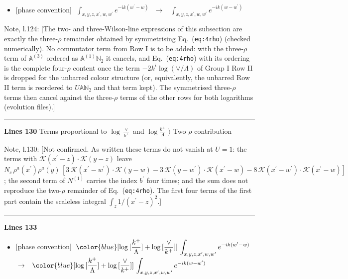 \documentclass[10pt]{article}
\newenvironment{notebox}{\def\FrameCommand{{\color{notebar}\vrule width 1.5pt}\hspace{6pt}}\MakeFramed{\advance\hsize-\width\FrameRestore}\small}{\endMakeFramed}
\def\mf#1{\mathbb{#1}}
\begin{document}
\begin{itemize}[leftmargin=2.2em,itemsep=1pt,topsep=2pt]
\item[\textbf{l.120}] \textsf{\small [phase convention]} $\displaystyle \,\,\int_{x,y,z,x^{\prime},w,w^{\prime}}e^{-ik(w^{\prime}-w)}\,$\ $\longrightarrow$\ $\displaystyle \,\,\int_{x,y,z,x^{\prime},w,w^{\prime}}e^{-ik(w-w^{\prime})}\,$
\end{itemize}
\begin{notebox}\textsf{\small Note, l.124:} [The two- and three-Wilson-line expressions of this subsection are exactly the three-$\rho$ remainder obtained by symmetrising Eq.~(\texttt{eq:4rho}) (checked numerically). No commutator term from Row I is to be added: with the three-$\rho$ term of $\mf{A}^{(3)}$ ordered as $\mf{A}^{(1)}\mf{N}_{2}$ it cancels, and Eq.~(\texttt{eq:4rho}) with its ordering is the complete four-$\rho$ content once the term $-2k^{i}\log(\vee/\Lambda)$ of Group I Row II is dropped for the unbarred colour structure (or, equivalently, the unbarred Row II term is reordered to $U\mf{A}\mf{N}_{2}$ and that term kept). The symmetrised three-$\rho$ terms then cancel against the three-$\rho$ terms of the other rows for both logarithms (evolution files).]\end{notebox}
\noindent\rule{\linewidth}{0.3pt}\par\noindent\textbf{Lines 130} \quad \textsf{Terms proportional to $\log{\frac{\vee}{k^{+}}}$ and $\log{\frac{k^{+}}{\Lambda}}$ $\rangle$ Two $\rho$ contribution}\par
\begin{notebox}\textsf{\small Note, l.130:} [Not confirmed. As written these terms do not vanish at $U=1$: the terms with $\mathcal{K}(x^{\prime}-z)\cdot\mathcal{K}(y-z)$ leave $N_{c}\,\rho^{a}(x^{\prime})\rho^{a}(y)\,[3\,\mathcal{K}(x^{\prime}-w^{\prime})\cdot\mathcal{K}(y-w)-3\,\mathcal{K}(y-w^{\prime})\cdot\mathcal{K}(x^{\prime}-w)-8\,\mathcal{K}(x^{\prime}-w^{\prime})\cdot\mathcal{K}(x^{\prime}-w)]$; the second term of $N^{(1)}$ carries the index $b^{\prime}$ four times; and the sum does not reproduce the two-$\rho$ remainder of Eq.~(\texttt{eq:4rho}). The first four terms of the first part contain the scaleless integral $\int_{z}1/(x^{\prime}-z)^{2}$.]\end{notebox}
\noindent\rule{\linewidth}{0.3pt}\par\noindent\textbf{Lines 133} \par
\begin{itemize}[leftmargin=2.2em,itemsep=1pt,topsep=2pt]
\item[\textbf{l.133}] \textsf{\small [phase convention]} $\displaystyle \,{\color{blue}[\log{[\frac{k^{+}}{\Lambda}]}+\log{[\frac{\vee}{k^{+}}]}]}\,\int_{x,y,z,x^{\prime},w,w^{\prime}}e^{-ik(w^{\prime}-w)}\,$\ $\longrightarrow$\ $\displaystyle \,{\color{blue}[\log{[\frac{k^{+}}{\Lambda}]}+\log{[\frac{\vee}{k^{+}}]}]}\,\int_{x,y,z,x^{\prime},w,w^{\prime}}e^{-ik(w-w^{\prime})}\,$
\end{itemize}
\end{document}
